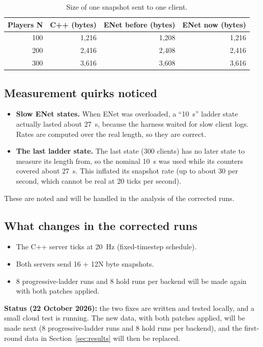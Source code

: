 \begin{table}[H]
\centering
\small
\begin{tabular}{rrrr}
\toprule
Players N & C++ (bytes) & ENet before (bytes) & ENet now (bytes) \\
\midrule
100 & 1,216 & 1,208 & 1,216 \\
200 & 2,416 & 2,408 & 2,416 \\
300 & 3,616 & 3,608 & 3,616 \\
\bottomrule
\end{tabular}
\caption{Size of one snapshot sent to one client.}
\label{tab:snapsize}
\end{table}

\subsection{Measurement quirks noticed}
\begin{itemize}
\item \textbf{Slow ENet states.} When ENet was overloaded, a ``10~s'' ladder state actually lasted about 27~s, because the harness waited for slow client logs. Rates are computed over the real length, so they are correct.
\item \textbf{The last ladder state.} The last state (300 clients) has no later state to measure its length from, so the nominal 10~s was used while its counters covered about 27~s. This inflated its snapshot rate (up to about 30 per second, which cannot be real at 20 ticks per second).
\end{itemize}
These are noted and will be handled in the analysis of the corrected runs.

\subsection{What changes in the corrected runs}
\begin{itemize}
\item The C++ server ticks at 20~Hz (fixed-timestep schedule).
\item Both servers send 16 + 12N byte snapshots.
\item 8 progressive-ladder runs and 8 hold runs per backend will be made again with both patches applied.
\end{itemize}
\textbf{Status (22 October 2026):} the two fixes are written and tested locally, and a small cloud test is running. The new data, with both patches applied, will be made next (8 progressive-ladder runs and 8 hold runs per backend), and the first-round data in Section~\ref{sec:results} will then be replaced.

